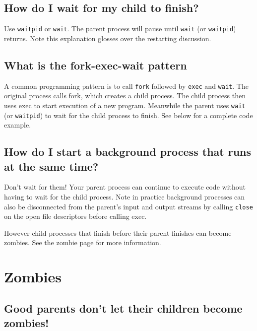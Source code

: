 \subsection{How do I wait for my child to
finish?}\label{how-do-i-wait-for-my-child-to-finish}

Use \texttt{waitpid} or \texttt{wait}. The parent process will pause
until \texttt{wait} (or \texttt{waitpid}) returns. Note this explanation
glosses over the restarting discussion.

\subsection{What is the fork-exec-wait
pattern}\label{what-is-the-fork-exec-wait-pattern}

A common programming pattern is to call \texttt{fork} followed by
\texttt{exec} and \texttt{wait}. The original process calls fork, which
creates a child process. The child process then uses exec to start
execution of a new program. Meanwhile the parent uses \texttt{wait} (or
\texttt{waitpid}) to wait for the child process to finish. See below for
a complete code example.

\subsection{How do I start a background process that runs at the same
time?}\label{how-do-i-start-a-background-process-that-runs-at-the-same-time}

Don't wait for them! Your parent process can continue to execute code
without having to wait for the child process. Note in practice
background processes can also be disconnected from the parent's input
and output streams by calling \texttt{close} on the open file
descriptors before calling exec.

However child processes that finish before their parent finishes can
become zombies. See the zombie page for more information.

\section{Zombies}\label{zombies}

\subsection{Good parents don't let their children become
zombies!}\label{good-parents-dont-let-their-children-become-zombies}

